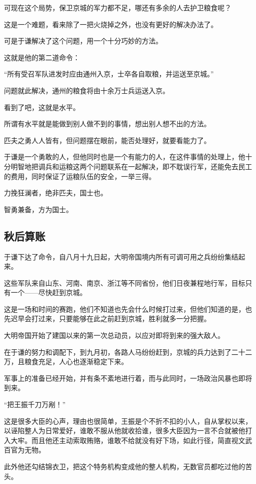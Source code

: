 \begin{multicols}{\theparacolNo}
可现在这个局势，保卫京城的军力都不足，哪还有多余的人去护卫粮食呢？

这是一个难题，看来除了一把火烧掉之外，也没有更好的解决办法了。

可是于谦解决了这个问题，用一个十分巧妙的方法。

这就是他的第二道命令：

“所有受召军队进发时应由通州入京，士卒各自取粮，并运送至京城。”

问题就此解决，通州的粮食将由十余万士兵运送入京。

看到了吧，这就是水平。

所谓有水平就是能做到别人做不到的事情，想出别人想不出的方法。

匹夫之勇人人皆有，但问题摆在眼前，能否处理好，就要看能力了。

于谦是一个勇敢的人，但他同时也是一个有能力的人，在这件事情的处理上，他十分明智地把调兵和运粮这两个问题联系在一起解决，即不耽误行军，还能免去民工的费用，同时保证了运粮队伍的安全，一举三得。

力挽狂澜者，绝非匹夫，国士也。

智勇兼备，方为国士。

\subsection{秋后算账}
于谦下达了命令，自八月十九日起，大明帝国境内所有可调可用之兵纷纷集结起来。

这些军队来自山东、河南、南京、浙江等不同省份，他们日夜兼程地行军，目标只有一个——尽快赶到京城。

这是一场和时间的赛跑，他们不知道也先会什么时候打过来，但他们知道的是，也先迟早会打过来，只要能够在此之前赶到京城，胜利就多一分把握。

大明帝国开始了建国以来的第一次总动员，以应对即将到来的强大敌人。

在于谦的努力和调配下，到九月初，各路人马纷纷赶到，京城的兵力达到了二十二万，且粮食充足，人心也逐渐稳定下来。

军事上的准备已经开始，并有条不紊地进行着，而与此同时，一场政治风暴也即将到来。

“把王振千刀万剐！”

这是很多大臣的心声，理由也很简单，王振是个不折不扣的小人，自从掌权以来，以诬陷整人为日常爱好，谁敢不服从他就收拾谁，很多大臣因为一言不合就被他打入大牢。而且他还主动索取贿赂，谁敢不给就没有好下场，如此行径，简直视文武百官为无物。

此外他还勾结锦衣卫，把这个特务机构变成他的整人机构，无数官员都吃过他的苦头。


\end{multicols}
